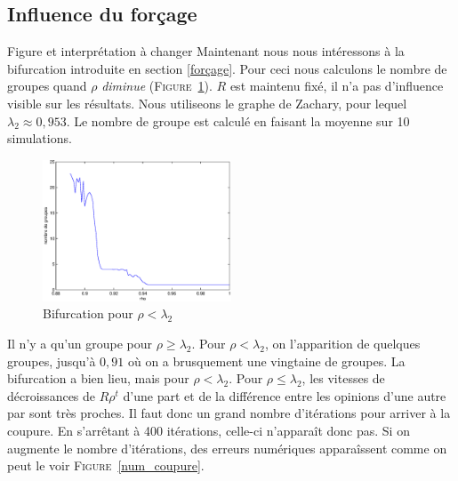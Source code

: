 \documentclass[12pt]{article}
\newcommand{\fig}[1]{\textsc{Figure}~\ref{#1}}
\begin{document}


\subsection{Influence du forçage}
Figure et interprétation à changer
Maintenant nous nous intéressons à la bifurcation introduite en section \ref{forçage}.
Pour ceci nous calculons le nombre de groupes quand $\rho$ \emph{diminue}
(\fig{bifu_map}). $R$ est maintenu fixé, il n'a pas d'influence visible sur les résultats.
Nous utiliseons le graphe de Zachary, pour lequel $\lambda_2 \approx 0,953$.
Le nombre de groupe est calculé en faisant la moyenne sur 10 simulations.

\begin{figure}[htb]
	\begin{center}
		\includegraphics[width=0.5\textwidth]{bifur}
		\caption{Bifurcation pour $\rho < \lambda_2$}
		\label{bifu_map}
	\end{center}
\end{figure}

Il n'y a qu'un groupe pour $\rho \geq \lambda_2$. Pour $\rho < \lambda_2$, on l'apparition de quelques groupes, jusqu'à $0,91$ où
on a brusquement une vingtaine de groupes. La bifurcation a bien lieu, mais pour $\rho < \lambda_2$. Pour $\rho \leq \lambda_2$, les
vitesses de décroissances de $R\rho^t$ d'une part et de la différence entre les opinions d'une autre par sont très proches. Il
faut donc un grand nombre d'itérations pour arriver à la coupure. En s'arrêtant à 400 itérations, celle-ci n'apparaît donc pas.
Si on augmente le nombre d'itérations, des erreurs numériques apparaîssent comme on peut le voir \fig{num_coupure}.
\end{document}
